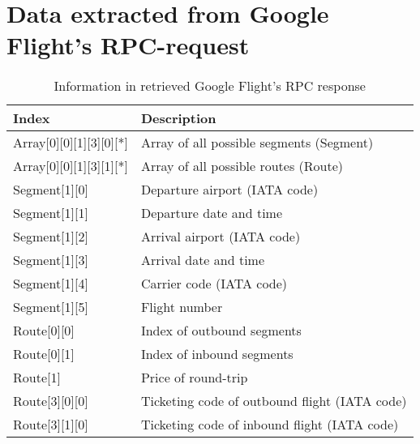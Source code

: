 \appendix
\chapter{Data extracted from Google Flight's RPC-request}
\label{app:DataExtractedFromGoogleFlightsRPCRequest}
\begin{table}[h]
	\centering
    \begin{tabular}{l l}
        \hline \hline
        Index                         & Description                                                              \\ \hline
        Array[0][0][1][3][0][*] 	  & Array of all possible segments (Segment)                                 \\ 
        Array[0][0][1][3][1][*] 	  & Array of all possible routes (Route)                                     \\ 
        Segment[1][0]                 & Departure airport (IATA code)                                            \\ 
        Segment[1][1]                 & Departure date and time                                                  \\ 
        Segment[1][2]                 & Arrival airport (IATA code)                                              \\ 
        Segment[1][3]                 & Arrival date and time                                                    \\ 
        Segment[1][4]                 & Carrier code (IATA code)                                                 \\ 
        Segment[1][5]                 & Flight number                                                            \\ 
        Route[0][0]                   & Index of outbound segments                                               \\ 
        Route[0][1]                   & Index of inbound segments                                                \\ 
        Route[1]                      & Price of round-trip                                                      \\ 
        Route[3][0][0]                & Ticketing code of outbound flight (IATA code) \\ 
        Route[3][1][0]                & Ticketing code of inbound flight (IATA code) \\ \hline
    \end{tabular}
	\caption{Information in retrieved Google Flight's RPC response}
\end{table}


